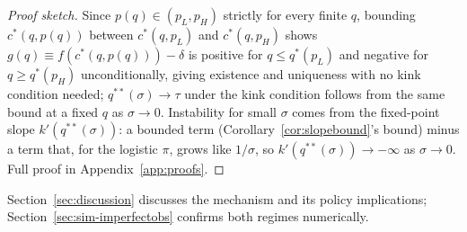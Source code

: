 \begin{proof}[Proof sketch]
Since $p(q)\in(p_L,p_H)$ strictly for every finite $q$, bounding $c^*(q,p(q))$ between $c^*(q,p_L)$ and $c^*(q,p_H)$ shows $g(q)\equiv f(c^*(q,p(q)))-\delta$ is positive for $q\le q^*(p_L)$ and negative for $q\ge q^*(p_H)$ unconditionally, giving existence and uniqueness with no kink condition needed; $q^{**}(\sigma)\to\tau$ under the kink condition follows from the same bound at a fixed $q$ as $\sigma\to0$. Instability for small $\sigma$ comes from the fixed-point slope $k'(q^{**}(\sigma))$: a bounded term (Corollary~\ref{cor:slopebound}'s bound) minus a term that, for the logistic $\pi$, grows like $1/\sigma$, so $k'(q^{**}(\sigma))\to-\infty$ as $\sigma\to0$. Full proof in Appendix~\ref{app:proofs}.
\end{proof}

Section~\ref{sec:discussion} discusses the mechanism and its policy implications; Section~\ref{sec:sim-imperfectobs} confirms both regimes numerically.
